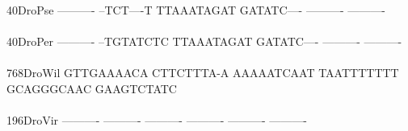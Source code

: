 \documentclass[11pt,twoside,reqno,a4paper]{article}
\begin{document}
{40\hspace*{3\charwidth}DroPse	----------	--TCT----T	TTAAATAGAT	GATATC----	----------	----------	\\
\hspace*{5\charwidth}\hspace*{7\charwidth}\hspace*{1\charwidth}\hspace*{1\charwidth}\hspace*{1\charwidth}\hspace*{1\charwidth}\hspace*{1\charwidth}\hspace*{1\charwidth}\\
40\hspace*{3\charwidth}DroPer	----------	--TGTATCTC	TTAAATAGAT	GATATC----	----------	----------	\\
\hspace*{5\charwidth}\hspace*{7\charwidth}\hspace*{1\charwidth}\hspace*{1\charwidth}\hspace*{1\charwidth}\hspace*{1\charwidth}\hspace*{1\charwidth}\hspace*{1\charwidth}\\
768\hspace*{2\charwidth}DroWil	GTTGAAAACA	CTTCTTTA-A	AAAAATCAAT	TAATTTTTTT	GCAGGGCAAC	GAAGTCTATC	\\
\hspace*{5\charwidth}\hspace*{7\charwidth}\hspace*{1\charwidth}\hspace*{1\charwidth}\hspace*{1\charwidth}\hspace*{1\charwidth}\hspace*{1\charwidth}\hspace*{1\charwidth}\\
196\hspace*{2\charwidth}DroVir	----------	----------	----------	----------	----------	----------	\\
\hspace*{5\charwidth}\hspace*{7\charwidth}\hspace*{1\charwidth}\hspace*{1\charwidth}\hspace*{1\charwidth}\hspace*{1\charwidth}\hspace*{1\charwidth}\hspace*{1\charwidth}\\
}
\end{document}
